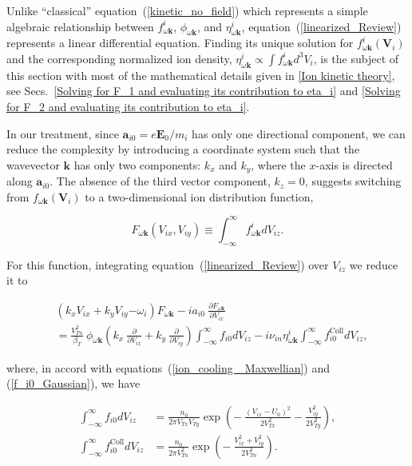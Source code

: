 \documentclass[draft]{agujournal2019}
\renewcommand{\vec}{\mathbf}
\begin{document}
Unlike ``classical'' equation~(\ref{kinetic_no_field}) which represents a simple algebraic
relationship between $f_{\omega\vec{k}}^{i}$, $\phi_{\omega\vec{k}}$, and
$\eta_{\omega\vec{k}}^{i}$, equation~(\ref{linearized_Review}) represents a
linear differential equation. Finding its unique solution for $f_{\omega
\vec{k}}^{i}(\vec{V}_i)$ and the corresponding normalized ion density, $\eta_{\omega
\vec{k}}^{i}\propto \int f_{\omega \vec{k}}^{i}d^3V_i$, is the subject 
of this section with most of the mathematical details given
in \ref{Ion kinetic theory}, see Secs.~\ref{Solving for F_1 and evaluating its contribution to eta_i}
and \ref{Solving for F_2 and evaluating its contribution to eta_i}.

In our treatment, since $\vec{a}_{i0}=e\vec{E}_{0}/m_{i}$ has only one directional component, 
we can reduce the complexity by introducing a coordinate system such that the
wavevector $\vec{k}$ has only two components: $k_{x}$ and $k_{y}$, where the
$x$-axis is directed along $\vec{a}_{i0}$. The absence of
the third vector component, $k_{z}=0$, suggests switching from $f_{\omega
\vec{k}}(\vec{V}_{i})$ to a two-dimensional ion distribution function,
\begin{linenomath*}
\begin{equation}
F_{\omega\vec{k}}(V_{ix},V_{iy})\equiv\int_{-\infty}^{\infty}f_{\omega\vec
{k}}^{i}dV_{iz}.\label{F_omega,k_Review}%
\end{equation}
\end{linenomath*}
For this function, integrating equation~(\ref{linearized_Review}) over $V_{iz}$ we reduce it to
\begin{linenomath*}
\begin{align}
&  \left(  k_{x}V_{ix}+k_{y}V_{iy}\mathbf{-}\omega_{i}\right)  F_{\omega\vec{k}%
}-ia_{i0}\ \frac{\partial F_{\omega\vec{k}}}{\partial V_{ix}}\nonumber\\
&  =\frac{V_{Tn}^{2}}{\beta_{T}}\ \phi_{\omega\vec{k}}\left(  k_{x}%
\ \frac{\partial}{\partial V_{ix}}+k_{y}\ \frac{\partial}{\partial V_{iy}%
}\right)  \int_{-\infty}^{\infty}f_{i0}dV_{iz}-i\nu_{in}\eta_{\omega\vec{k}%
}^{i}\int_{-\infty}^{\infty}f_{i0}^{\mathrm{Coll}}dV_{iz}%
,\label{kinetic_with_field}%
\end{align}
\end{linenomath*}
where, in accord with equations~(\ref{ion_cooling _Maxwellian}) and (\ref{f_i0_Gaussian}), we have
\begin{linenomath*}
\begin{subequations}
\label{Int_f_0,F^Coll_over_V_z}
\begin{align}
\int_{-\infty}^{\infty}f_{i0}dV_{iz} &  =\frac{n_{0}}{2\pi V_{Tx}V_{Ty}}\exp\left(  -~\frac{(V_{ix}-U_{0})^{2}}{2V_{Tx}^{2}}%
-\frac{V_{iy}^{2}}{2V_{Ty}^{2}}\right)  ,\label{Int_f_0_over_V_z}\\
\int_{-\infty}^{\infty}f_{i0}^{\mathrm{Coll}}dV_{iz} &  =\frac{n_{0}}{2\pi
V_{Tn}^{2}}\exp\left(  -~\frac{V_{ix}^{2}+V_{iy}^{2}}{2V_{Tn}^{2}}\right)
.\label{Int_f_0^Coll_over_V_z}%
\end{align}
\end{subequations}
\end{linenomath*}
\end{document}
